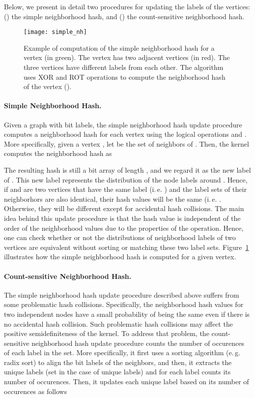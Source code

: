 \documentclass[twoside,11pt]{article}
\newcommand{\eg}{e.\,g. }
\newcommand{\ie}{i.\,e. }
\begin{document}
Below, we present in detail two procedures for updating the labels of the vertices: () the simple neighborhood hash, and () the count-sensitive neighborhood hash.

\begin{figure}[t]
  \centering
  \texttt{[image: simple\_nh]}
  \caption{Example of computation of the simple neighborhood hash for a vertex (in green). The vertex has two adjacent vertices (in red). The three vertices have different labels from each other. The algorithm uses XOR and ROT operations to compute the neighborhood hash of the vertex ().}
  \label{fig:simple_nh}
\end{figure}

\paragraph{Simple Neighborhood Hash.}
Given a graph  with bit labels, the simple neighborhood hash update procedure computes a neighborhood hash for each vertex using the logical operations  and .
More specifically, given a vertex , let  be the set of neighbors of .
Then, the kernel computes the neighborhood hash as

The resulting hash  is still a bit array of length , and we regard it as the new label of .
This new label represents the distribution of the node labels around .
Hence, if  and  are two vertices that have the same label (\ie ) and the label sets of their neighborhors are also identical, their hash values will be the same (\ie .
Otherwise, they will be different except for accidental hash collisions.
The main idea behind this update procedure is that the hash value is independent of the order of the neighborhood values due to the properties of the  operation.
Hence, one can check whether or not the distributions of neighborhood labels of two vertices are equivalent without sorting or matching these two label sets.
Figure~\ref{fig:simple_nh} illustrates how the simple neighborhood hash is computed for a given vertex.

\paragraph{Count-sensitive Neighborhood Hash.}
The simple neighborhood hash update procedure described above suffers from some problematic hash collisions.
Specifically, the neighborhood hash values for two independent nodes have a small probability of being the same even if there is no accidental hash collision.
Such problematic hash collisions may affect the positive semidefiniteness of the kernel.
To address that problem, the count-sensitive neighborhood hash update procedure counts the number of occurences of each label in the set.
More specifically, it first uses a sorting algorithm (\eg radix sort) to align the bit labels of the neighbors, and then, it extracts the unique labels (set  in the case of  unique labels) and for each label counts its number of occurences.
Then, it updates each unique label based on its number of occurences as follows
\end{document}

